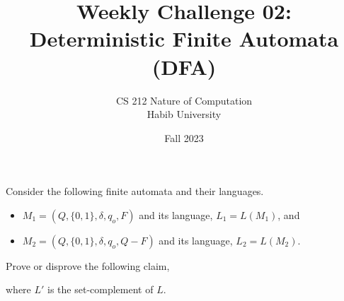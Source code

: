 \documentclass[a4paper]{exam}
\title{Weekly Challenge 02: Deterministic Finite Automata (DFA)}
\author{CS 212 Nature of Computation\\Habib University}
\date{Fall 2023}
\begin{document}
\maketitle

\begin{questions}
  

  Consider the following finite automata and their languages.
  \begin{itemize}
  \item $M_1=(Q, \{0,1\}, \delta, q_o, F)$ and its language, $L_1=L(M_1)$, and
  \item $M_2=(Q, \{0,1\}, \delta, q_o, Q-F)$ and its language, $L_2=L(M_2)$.
  \end{itemize}

  Prove or disprove the following claim,
  
  \centerline{
  }
  where $L'$ is the set-complement of $L$.

    
  
\end{questions}
\end{document}
